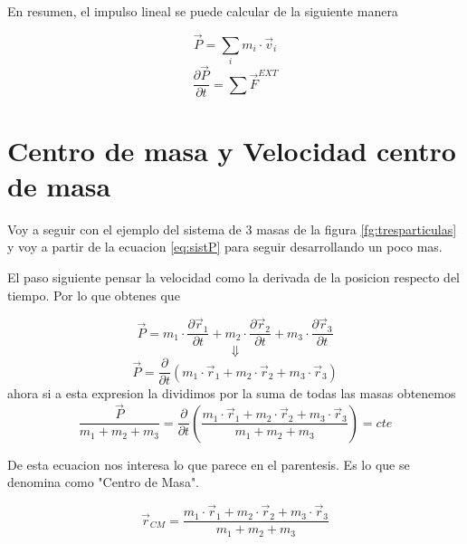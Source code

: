 \documentclass[../Main.tex]{subfiles}
\begin{document}
{    En resumen, el impulso lineal se puede calcular de la siguiente manera

    \begin{equation*}
        \vec{P} = \sum _i m_i \cdot \vec{v} _i
    \end{equation*}
    \begin{equation*}
        \frac{\partial \vec{P}}{\partial t} = \sum \vec{F}^{EXT}
    \end{equation*}

 }

 \npage{
 }
 {
     \section{Centro de masa y Velocidad centro de masa}

     Voy a seguir con el ejemplo del sistema de 3 masas de la figura \ref{fg:tresparticulas}
     y voy a partir de la ecuacion \ref{eq:sistP} para seguir desarrollando un poco mas.

     El paso siguiente pensar la velocidad como la derivada de la posicion respecto
     del tiempo. Por lo que obtenes que 

     \begin{equation*}
         \vec{P} = m_1 \cdot \frac{\partial \vec{r} _1}{\partial t} + m_2 \cdot \frac{\partial \vec{r} _2}{\partial t} + m_3 \cdot \frac{\partial \vec{r} _3}{\partial t}
     \end{equation*}
     \begin{equation*}
         \Downarrow
     \end{equation*}
     \begin{equation*}
         \vec{P} = \frac{\partial}{\partial t}(m_1 \cdot \vec{r} _1 + m_2 \cdot \vec{r} _2 + m_3 \cdot \vec{r} _3)
     \end{equation*}
     ahora si a esta expresion la dividimos por la suma de todas las masas obtenemos
     \begin{equation}
         \frac{\vec{P}}{m_1 + m_2 + m_3} = \frac{\partial}{\partial t} \left(\frac{m_1 \cdot \vec{r} _1 + m_2 \cdot \vec{r} _2 + m_3 \cdot \vec{r} _3}{m_1 + m_2 + m_3} \right) = cte
         \label{eq:preRC}
     \end{equation}

     De esta ecuacion nos interesa lo que parece en el parentesis. Es lo que se
     denomina como "Centro de Masa". 

     \begin{equation}
         \vec{r} _{CM} = \frac{m_1 \cdot \vec{r} _1 + m_2 \cdot \vec{r} _2 + m_3 \cdot \vec{r} _3}{m_1 + m_2 + m_3}
         \label{eq:rc}
     \end{equation}

}
\end{document}
